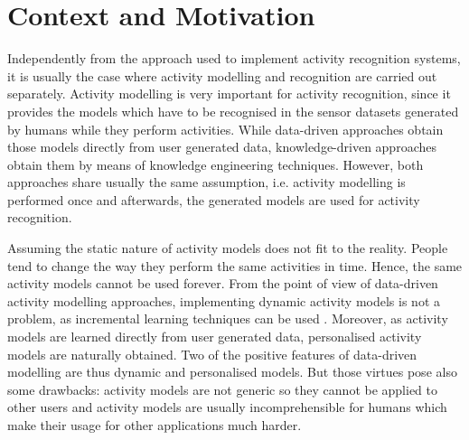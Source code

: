 \section{Context and Motivation}
\label{sec:intro:context}



Independently from the approach used to implement activity recognition systems, it is usually the case where activity modelling and recognition are carried out separately. Activity modelling is very important for activity recognition, since it provides the models which have to be recognised in the sensor datasets generated by humans while they perform activities. While data-driven approaches obtain those models directly from user generated data, knowledge-driven approaches obtain them by means of knowledge engineering techniques. However, both approaches share usually the same assumption, i.e. activity modelling is performed once and afterwards, the generated models are used for activity recognition. 


Assuming the static nature of activity models does not fit to the reality. People tend to change the way they perform the same activities in time. Hence, the same activity models cannot be used forever. From the point of view of data-driven activity modelling approaches, implementing dynamic activity models is not a problem, as incremental learning techniques can be used \cite{Rashidi2011}. Moreover, as activity models are learned directly from user generated data, personalised activity models are naturally obtained. Two of the positive features of data-driven modelling are thus dynamic and personalised models. But those virtues pose also some drawbacks: activity models are not generic so they cannot be applied to other users and activity models are usually incomprehensible for humans which make their usage for other applications much harder.

